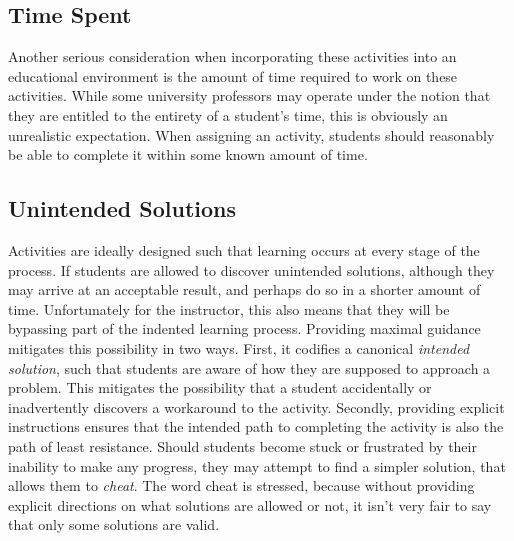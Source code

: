         
    \subsection{Time Spent}
        Another serious consideration when incorporating these activities into an educational environment is the amount of time required to work on these activities. %
While some university professors may operate under the notion that they are entitled to the entirety of a student's time, this is obviously an unrealistic expectation. %
When assigning an activity, students should reasonably be able to complete it within some known amount of time. 

                                
    \subsection{Unintended Solutions}
        Activities are ideally designed such that learning occurs at every stage of the process. %
If students are allowed to discover unintended solutions, although they may arrive at an acceptable result, and perhaps do so in a shorter amount of time. %
Unfortunately for the instructor, this also means that they will be bypassing part of the indented learning process. %
Providing maximal guidance mitigates this possibility in two ways. %
First, it codifies a canonical \emph{intended solution}, such that students are aware of how they are supposed to approach a problem. %
This mitigates the possibility that a student accidentally or inadvertently discovers a workaround to the activity. %
Secondly, providing explicit instructions ensures that the intended path to completing the activity is also the path of least resistance. %
Should students become stuck or frustrated by their inability to make any progress, they may attempt to find a simpler solution, that allows them to \emph{cheat}. %
The word cheat is stressed, because without providing explicit directions on what solutions are allowed or not, it isn't very fair to say that only some solutions are valid. 

        
    

        

